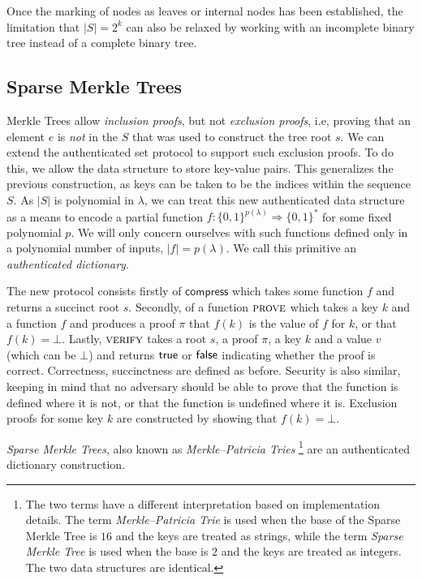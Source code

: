 Once the marking of nodes as leaves or internal nodes
has been established, the limitation that $|S| = 2^k$ can also be relaxed by
working with an incomplete binary tree instead of a complete binary tree.

\subsection{Sparse Merkle Trees}
Merkle Trees allow \emph{inclusion proofs}, but not
\emph{exclusion proofs}, i.e, proving that an element $e$ is \emph{not} in
the $S$ that was used to construct the tree root $s$. We can extend the
authenticated set protocol to support such exclusion proofs. To
do this, we allow the data structure to store key-value pairs. This generalizes
the previous construction, as keys can be taken to be the indices within the
sequence $S$. As $|S|$ is polynomial in $\lambda$, we can treat this new
authenticated data structure as a means to encode a partial function
$f: \{0, 1\}^{p(\lambda)} \Rightarrow \{0, 1\}^*$ for some fixed polynomial $p$.
We will only concern ourselves with such functions defined only in a polynomial
number of inputs, $|f| = p(\lambda)$.
We call this primitive an \emph{authenticated dictionary}.

The new protocol consists firstly of $\textsf{compress}$ which takes some function $f$
and returns a succinct root $s$. Secondly, of a function $\textsc{prove}$ which
takes a key $k$ and a function $f$ and produces a proof $\pi$ that $f(k)$ is the
value of $f$ for $k$, or that $f(k) = \bot$. Lastly, $\textsc{verify}$ takes a
root $s$, a proof $\pi$, a key $k$ and a value $v$ (which can be $\bot$) and
returns $\textsf{true}$ or $\textsf{false}$ indicating whether the proof is correct.
Correctness, succinctness are defined as before. Security is also similar,
keeping in mind that no adversary should be able to prove that the function is
defined where it is not, or that the function is undefined where it is.
Exclusion proofs for some key $k$ are constructed by showing that $f(k) = \bot$.

\emph{Sparse Merkle Trees}, also known as \emph{Merkle--Patricia Tries}
\footnote{The two terms have a different interpretation based on implementation
details. The term \emph{Merkle--Patricia Trie} is used when the base of the
Sparse Merkle Tree is $16$ and the keys are treated as strings, while the term
\emph{Sparse Merkle Tree} is used when the base is $2$ and the keys are treated
as integers. The two data structures are identical.} are an authenticated
dictionary construction.


